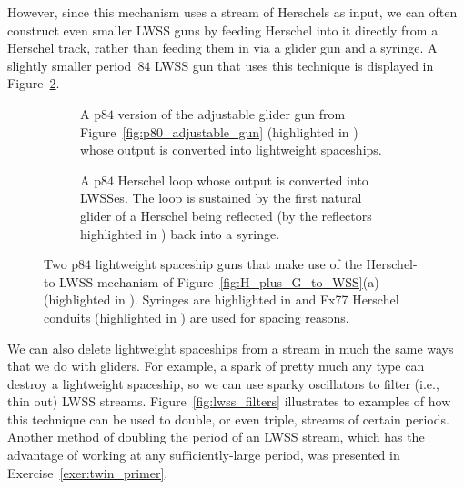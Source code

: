 However, since this mechanism uses a stream of Herschels as input, we can often construct even smaller LWSS guns by feeding Herschel into it directly from a Herschel track, rather than feeding them in via a glider gun and a syringe. A slightly smaller period~$84$ LWSS gun that uses this technique is displayed in Figure~\ref{fig:p84_lwss_gun}.

\begin{figure}[!htb]
	\centering
	\begin{subfigure}{0.45\textwidth}
		\centering
		\caption{A p$84$ version of the adjustable glider gun from Figure~\ref{fig:p80_adjustable_gun} (highlighted in ) whose output is converted into lightweight spaceships.}\label{fig:p84_lwss_gun_adjustable}
	\end{subfigure} \hfill \begin{subfigure}{0.52\textwidth}
		\centering
		\caption{A p$84$ Herschel loop whose output is converted into LWSSes. The loop is sustained by the first natural glider of a Herschel being reflected (by the reflectors highlighted in ) back into a syringe.}\label{fig:p84_lwss_gun}
	\end{subfigure}
	\caption{Two p$84$ lightweight spaceship guns that make use of the Herschel-to-LWSS mechanism of Figure~\ref{fig:H_plus_G_to_WSS}(a) (highlighted in ). Syringes are highlighted in  and Fx77 Herschel conduits (highlighted in ) are used for spacing reasons.}\label{fig:p84_lwss_gun_both}
\end{figure}

We can also delete lightweight spaceships from a stream in much the same ways that we do with gliders. For example, a spark of pretty much any type can destroy a lightweight spaceship, so we can use sparky oscillators to filter (i.e., thin out) LWSS streams. Figure~\ref{fig:lwss_filters} illustrates to examples of how this technique can be used to double, or even triple, streams of certain periods. Another method of doubling the period of an LWSS stream, which has the advantage of working at any sufficiently-large period, was presented in Exercise~\ref{exer:twin_primer}.

